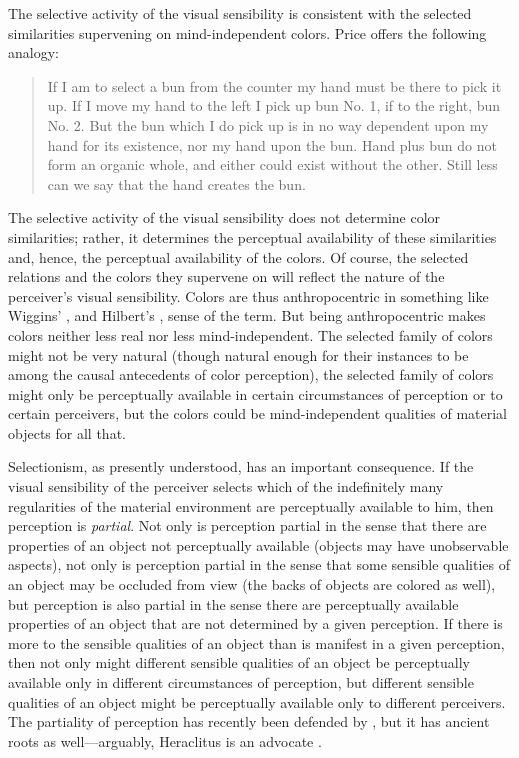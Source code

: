 \documentclass[12pt]{article}
\begin{document}
The selective activity of the visual sensibility is consistent with the selected similarities supervening on mind-independent colors. Price offers the following analogy: 
\begin{quote}
	If I am to select a bun from the counter my hand must be there to pick it up. If I move my hand to the left I pick up bun No. 1, if to the right, bun No. 2. But the bun which I do pick up is in no way dependent upon my hand for its existence, nor my hand upon the bun. Hand plus bun do not form an organic whole, and either could exist without the other. Still less can we say that the hand creates the bun. \citep[40]{Price:1932fk} 
\end{quote}
The selective activity of the visual sensibility does not determine color similarities; rather, it determines the perceptual availability of these similarities and, hence, the perceptual availability of the colors. Of course, the selected relations and the colors they supervene on will reflect the nature of the perceiver's visual sensibility. Colors are thus anthropocentric in something like Wiggins' \citeyearpar{Wiggins:1987ta}, and Hilbert's \citeyearpar{Hilbert:1987jq}, sense of the term. But being anthropocentric makes colors neither less real nor less mind-independent. The selected family of colors might not be very natural (though natural enough for their instances to be among the causal antecedents of color perception), the selected family of colors might only be perceptually available in certain circumstances of perception or to certain perceivers, but the colors could be mind-independent qualities of material objects for all that.

Selectionism, as presently understood, has an important consequence. If the visual sensibility of the perceiver selects which of the indefinitely many regularities of the material environment are perceptually available to him, then perception is \emph{partial}. Not only is perception partial in the sense that there are properties of an object not perceptually available (objects may have unobservable aspects), not only is perception partial in the sense that some sensible qualities of an object may be occluded from view (the backs of objects are colored as well), but perception is also partial in the sense there are perceptually available properties of an object that are not determined by a given perception. If there is more to the sensible qualities of an object than is manifest in a given perception, then not only might different sensible qualities of an object be perceptually available only in different circumstances of perception, but different sensible qualities of an object might be perceptually available only to different perceivers. The partiality of perception has recently been defended by \citet{Hilbert:1987jq}, but it has ancient roots as well---arguably, Heraclitus is an advocate \citep[see][]{Burnyeat:1979mv,Kalderon:2006tg}.
\end{document}
